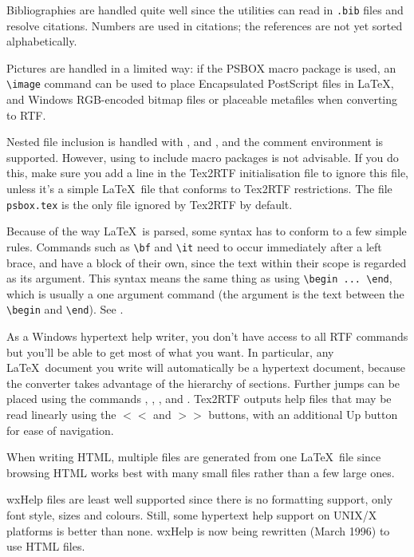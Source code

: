 Bibliographies are handled quite well since the utilities can read in\rtfsp
{\tt .bib} files and resolve citations. Numbers are used in citations;
the references are not yet sorted alphabetically.

Pictures are handled in a limited way: if the PSBOX macro package is
used, an \verb$\image$ command can be used to place Encapsulated PostScript
files in \LaTeX, and Windows RGB-encoded bitmap files or placeable
metafiles when converting to RTF.

Nested file inclusion is handled with \verb$$, \verb$$ and \verb$$,
and the comment environment is supported. However, using \verb$$\rtfsp
to include macro packages is not advisable. If you do this,
make sure you add a line in the Tex2RTF initialisation file to ignore
this file, unless it's a simple \LaTeX\ file that conforms to Tex2RTF
restrictions. The file {\tt psbox.tex} is the only file ignored
by Tex2RTF by default.

Because of the way \LaTeX\ is parsed, some syntax has to conform to a
few simple rules. Commands such as \verb$\bf$ and \verb$\it$ need to occur
immediately after a left brace, and have a block of their own, since
the text within their scope is regarded as its argument. This syntax
means the same thing as using \verb$\begin ... \end$, which is usually
a one argument command (the argument is the text between the \verb$\begin$\rtfsp
and \verb$\end$). See .

As a Windows hypertext help writer, you don't have access to all RTF
commands but you'll be able to get most of what you want. In particular,
any \LaTeX\ document you write will automatically be a hypertext
document, because the converter takes advantage of the hierarchy of
sections. Further jumps can be placed using the commands
\rtfsp{}, ,
\rtfsp{}, and .
Tex2RTF outputs help files that may be read linearly using the
\rtfsp$<<$ and $>>$ buttons, with an additional Up button for
ease of navigation.

When writing HTML, multiple files are generated from one \LaTeX\ file
since browsing HTML works best with many small files rather than a few
large ones.

wxHelp files are least well supported since there is no formatting
support, only font style, sizes and colours. Still, some hypertext help
support on UNIX/X platforms is better than none. wxHelp is now being rewritten (March 1996)
to use HTML files.

